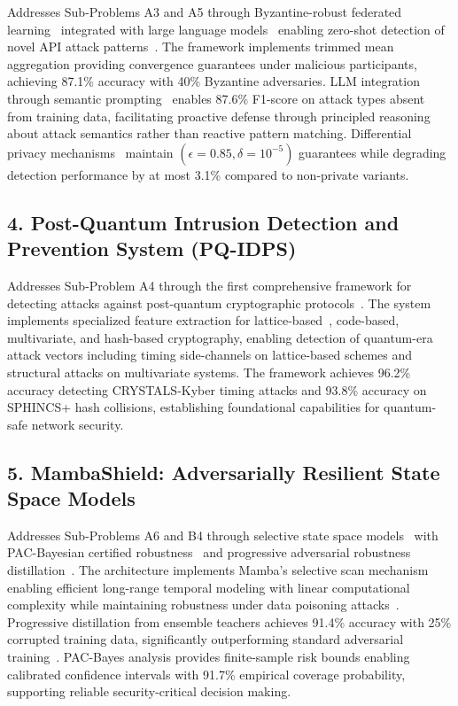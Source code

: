 Addresses Sub-Problems A3 and A5 through Byzantine-robust federated learning~\cite{blanchard2017machine} integrated with large language models~\cite{devlin2019bert,brown2020language} enabling zero-shot detection of novel API attack patterns~\cite{fang2023llm4ids}. The framework implements trimmed mean aggregation providing convergence guarantees under malicious participants, achieving 87.1\% accuracy with 40\% Byzantine adversaries. LLM integration through semantic prompting~\cite{wei2022chain} enables 87.6\% F1-score on attack types absent from training data, facilitating proactive defense through principled reasoning about attack semantics rather than reactive pattern matching. Differential privacy mechanisms~\cite{abadi2016deep} maintain $(\epsilon = 0.85, \delta = 10^{-5})$ guarantees while degrading detection performance by at most 3.1\% compared to non-private variants.

\subsection*{4. Post-Quantum Intrusion Detection and Prevention System (PQ-IDPS)}

Addresses Sub-Problem A4 through the first comprehensive framework for detecting attacks against post-quantum cryptographic protocols~\cite{bernstein2017post,alagic2020nist}. The system implements specialized feature extraction for lattice-based~\cite{avanzi2019crystals}, code-based, multivariate, and hash-based cryptography, enabling detection of quantum-era attack vectors including timing side-channels on lattice-based schemes and structural attacks on multivariate systems. The framework achieves 96.2\% accuracy detecting CRYSTALS-Kyber timing attacks and 93.8\% accuracy on SPHINCS+ hash collisions, establishing foundational capabilities for quantum-safe network security.

\subsection*{5. MambaShield: Adversarially Resilient State Space Models}

Addresses Sub-Problems A6 and B4 through selective state space models~\cite{gu2022efficiently} with PAC-Bayesian certified robustness~\cite{mcallester2003pac,dziugaite2017computing} and progressive adversarial robustness distillation~\cite{papernot2016distillation}. The architecture implements Mamba's selective scan mechanism~\cite{gu2024mamba} enabling efficient long-range temporal modeling with linear computational complexity while maintaining robustness under data poisoning attacks~\cite{biggio2012poisoning}. Progressive distillation from ensemble teachers achieves 91.4\% accuracy with 25\% corrupted training data, significantly outperforming standard adversarial training~\cite{madry2018towards}. PAC-Bayes analysis provides finite-sample risk bounds enabling calibrated confidence intervals with 91.7\% empirical coverage probability, supporting reliable security-critical decision making.

